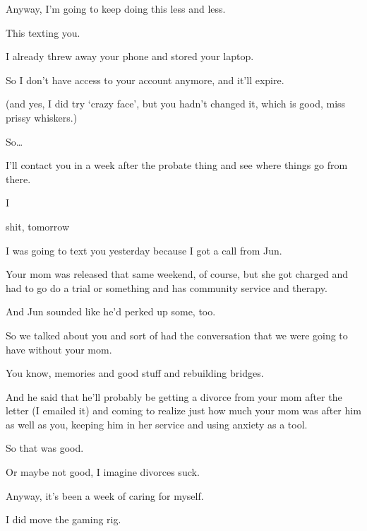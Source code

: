 { Anyway, I'm going to keep doing this less and less.

 This texting you.

 I already threw away your phone and stored your laptop.

 So I don't have access to your account anymore, and it'll expire.

(and yes, I did try `crazy face', but you hadn't changed it, which is good, miss prissy whiskers.)

 So\ldots{}

 I'll contact you in a week after the probate thing and see where things go from there.

\nopagebreak

 I

 shit, tomorrow

\nopagebreak

 I was going to text you yesterday because I got a call from Jun.

 Your mom was released that same weekend, of course, but she got charged and had to go do a trial or something and has community service and therapy.

 And Jun sounded like he'd perked up some, too.

 So we talked about you and sort of had the conversation that we were going to have without your mom.

 You know, memories and good stuff and rebuilding bridges.

 And he said that he'll probably be getting a divorce from your mom after the letter (I emailed it) and coming to realize just how much your mom was after him as well as you, keeping him in her service and using anxiety as a tool.

 So that was good.

 Or maybe not good, I imagine divorces suck.

 Anyway, it's been a week of caring for myself.

 I did move the gaming rig.

}

